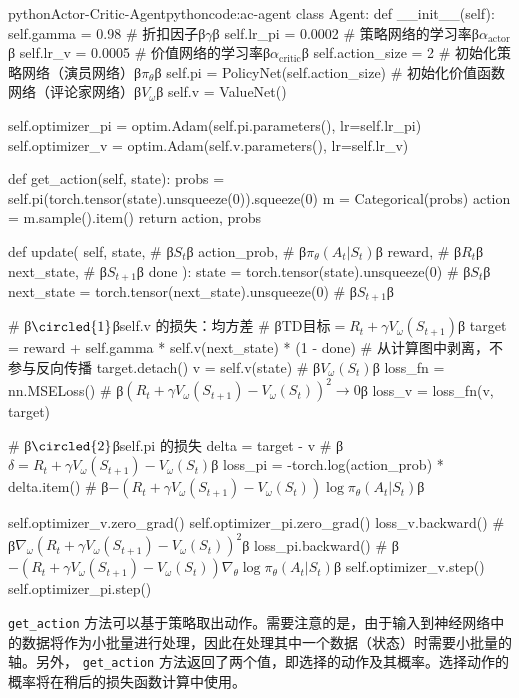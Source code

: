 \documentclass[lang=cn,newtx,10pt,scheme=chinese]{elegantbook}
\newcommand{\py}[1]{%
  \colorbox{gray!10}{\texttt{#1}}%
}
\begin{document}
\begin{codebox}{python}{Actor-Critic-Agent}{pythoncode:ac-agent}
class Agent:
    def __init__(self):
        self.gamma = 0.98 # 折扣因子β$\gamma$β
        self.lr_pi = 0.0002 # 策略网络的学习率β$\alpha_\text{actor}$β
        self.lr_v = 0.0005 # 价值网络的学习率β$\alpha_\text{critic}$β
        self.action_size = 2
        # 初始化策略网络（演员网络）β$\pi_\theta$β
        self.pi = PolicyNet(self.action_size)
        # 初始化价值函数网络（评论家网络）β$V_\omega$β
        self.v = ValueNet()

        self.optimizer_pi = optim.Adam(self.pi.parameters(), lr=self.lr_pi)
        self.optimizer_v = optim.Adam(self.v.parameters(), lr=self.lr_v)

    def get_action(self, state):
        probs = self.pi(torch.tensor(state).unsqueeze(0)).squeeze(0)
        m = Categorical(probs)
        action = m.sample().item()
        return action, probs

    def update(
        self,
        state, # β$S_t$β
        action_prob, # β$\pi_\theta(A_t|S_t)$β
        reward, # β$R_t$β
        next_state, # β$S_{t+1}$β
        done
    ):
        state = torch.tensor(state).unsqueeze(0) # β$S_t$β
        next_state = torch.tensor(next_state).unsqueeze(0) # β$S_{t+1}$β

        # β$\circled{1}$βself.v 的损失：均方差
        # β$\text{TD目标}=R_t+\gamma{V_\omega(S_{t+1})}$β
        target = reward + self.gamma * self.v(next_state) * (1 - done)
        # 从计算图中剥离，不参与反向传播
        target.detach()
        v = self.v(state) # β$V_\omega(S_t)$β
        loss_fn = nn.MSELoss() # β$(R_t+\gamma{V_\omega(S_{t+1})}-V_\omega(S_t))^2\rightarrow{0}$β
        loss_v = loss_fn(v, target)

        # β$\circled{2}$βself.pi 的损失
        delta = target - v # β$\delta=R_t+\gamma{V_\omega(S_{t+1})}-V_\omega(S_t)$β
        loss_pi = -torch.log(action_prob) * delta.item() # β$-\left( R_t+\gamma{V_\omega(S_{t+1})}-V_\omega(S_t) \right)\log{\pi_\theta(A_t|S_t)}$β

        self.optimizer_v.zero_grad()
        self.optimizer_pi.zero_grad()
        loss_v.backward() # β$\nabla_\omega(R_t+\gamma{V_\omega(S_{t+1})}-V_\omega(S_t))^2$β
        loss_pi.backward() # β$-\left( R_t+\gamma{V_\omega(S_{t+1})}-V_\omega(S_t) \right)\nabla_\theta\log{\pi_\theta(A_t|S_t)}$β
        self.optimizer_v.step()
        self.optimizer_pi.step()
\end{codebox}

\py{get_action} 方法可以基于策略取出动作。需要注意的是，由于输入到神经网络中的数据将作为小批量进行处理，因此在处理其中一个数据（状态）时需要小批量的轴。另外，\py{get_action} 方法返回了两个值，即选择的动作及其概率。选择动作的概率将在稍后的损失函数计算中使用。
\end{document}
